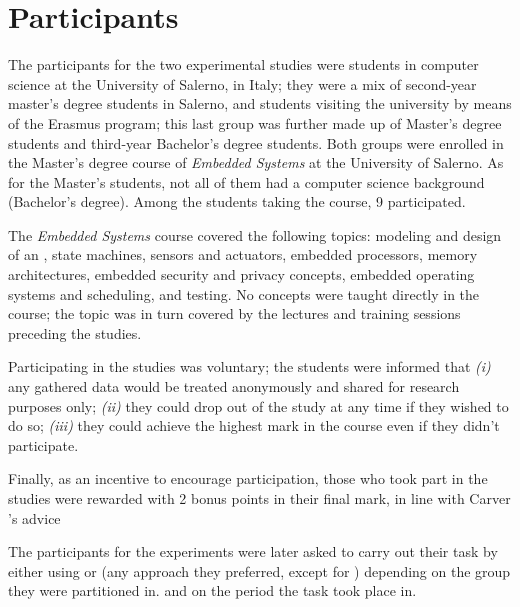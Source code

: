 \section{Participants}
The participants for the two experimental studies were students in computer science at the University of Salerno, in Italy; they were a mix of second-year master's degree students in Salerno, and students visiting the university by means of the Erasmus program; this last group was further made up of Master's degree students and third-year Bachelor's degree students. Both groups were enrolled in the Master's degree course of \textit{Embedded Systems} at the University of Salerno. As for the Master's students, not all of them had a computer science background (Bachelor's degree). Among the students taking the course, 9 participated.

The \textit{Embedded Systems} course covered the following topics: modeling and design of an \es, state machines, sensors and actuators, embedded processors, memory architectures, embedded security and privacy concepts, embedded operating systems and scheduling, and \es testing.
No \tdd concepts were taught directly in the course; the topic was in turn covered  by the lectures and training sessions preceding the studies.

Participating in the studies was voluntary; the students were informed that \textit{(i)} any gathered data would be treated anonymously and shared for research purposes only; \textit{(ii)} they could drop out of the study at any time if they wished to do so; \textit{(iii)} they could achieve the highest mark in the course even if they didn't participate.

Finally, as an incentive to encourage participation, those who took part in the studies were rewarded with 2 bonus points in their final mark, in line with Carver \etal's advice \cite{DBLP:conf/metrics/CarverJMS03}

The participants for the experiments were later asked to carry out their task by either using \tdd or \notdd (\ie any approach they preferred, except for \tdd) depending on the group they were partitioned in. and on the period the task took place in.





